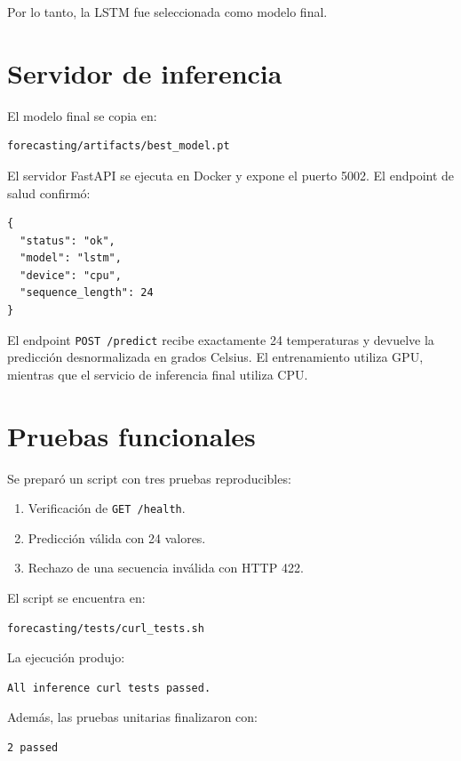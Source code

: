 \documentclass[conference]{IEEEtran}
\begin{document}
Por lo tanto, la LSTM fue seleccionada como modelo final.

\section{Servidor de inferencia}

El modelo final se copia en:

\begin{lstlisting}
forecasting/artifacts/best_model.pt
\end{lstlisting}

El servidor FastAPI se ejecuta en Docker y expone el puerto 5002. El
endpoint de salud confirmó:

\begin{lstlisting}
{
  "status": "ok",
  "model": "lstm",
  "device": "cpu",
  "sequence_length": 24
}
\end{lstlisting}

El endpoint \texttt{POST /predict} recibe exactamente 24 temperaturas y
devuelve la predicción desnormalizada en grados Celsius. El entrenamiento
utiliza GPU, mientras que el servicio de inferencia final utiliza CPU.

\section{Pruebas funcionales}

Se preparó un script con tres pruebas reproducibles:

\begin{enumerate}
    \item Verificación de \texttt{GET /health}.
    \item Predicción válida con 24 valores.
    \item Rechazo de una secuencia inválida con HTTP 422.
\end{enumerate}

El script se encuentra en:

\begin{lstlisting}
forecasting/tests/curl_tests.sh
\end{lstlisting}

La ejecución produjo:

\begin{lstlisting}
All inference curl tests passed.
\end{lstlisting}

Además, las pruebas unitarias finalizaron con:

\begin{lstlisting}
2 passed
\end{lstlisting}
\end{document}
